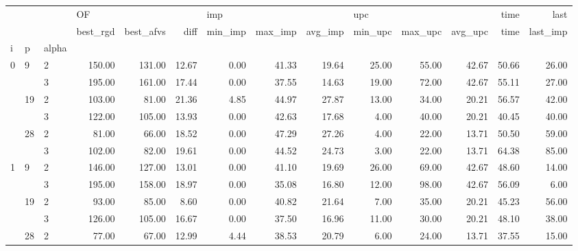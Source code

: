 \begin{tabular}{lllrrrrrrrrrrr}
\toprule
  &    &   & \multicolumn{3}{l}{OF} & \multicolumn{3}{l}{imp} & \multicolumn{3}{l}{upc} &   time &     last \\
  &    &   & best\_rgd & best\_afvs &  diff & min\_imp & max\_imp & avg\_imp & min\_upc & max\_upc & avg\_upc &   time & last\_imp \\
i & p & alpha &          &           &       &         &         &         &         &         &         &        &          \\
\midrule
\multirow{6}{*}{0} & \multirow{2}{*}{9} & 2 &   150.00 &    131.00 & 12.67 &    0.00 &   41.33 &   19.64 &   25.00 &   55.00 &   42.67 &  50.66 &    26.00 \\
  &    & 3 &   195.00 &    161.00 & 17.44 &    0.00 &   37.55 &   14.63 &   19.00 &   72.00 &   42.67 &  55.11 &    27.00 \\
\cline{2-14}
  & \multirow{2}{*}{19} & 2 &   103.00 &     81.00 & 21.36 &    4.85 &   44.97 &   27.87 &   13.00 &   34.00 &   20.21 &  56.57 &    42.00 \\
  &    & 3 &   122.00 &    105.00 & 13.93 &    0.00 &   42.63 &   17.68 &    4.00 &   40.00 &   20.21 &  40.45 &    40.00 \\
\cline{2-14}
  & \multirow{2}{*}{28} & 2 &    81.00 &     66.00 & 18.52 &    0.00 &   47.29 &   27.26 &    4.00 &   22.00 &   13.71 &  50.50 &    59.00 \\
  &    & 3 &   102.00 &     82.00 & 19.61 &    0.00 &   44.52 &   24.73 &    3.00 &   22.00 &   13.71 &  64.38 &    85.00 \\
\cline{1-14}
\cline{2-14}
\multirow{6}{*}{1} & \multirow{2}{*}{9} & 2 &   146.00 &    127.00 & 13.01 &    0.00 &   41.10 &   19.69 &   26.00 &   69.00 &   42.67 &  48.60 &    14.00 \\
  &    & 3 &   195.00 &    158.00 & 18.97 &    0.00 &   35.08 &   16.80 &   12.00 &   98.00 &   42.67 &  56.09 &     6.00 \\
\cline{2-14}
  & \multirow{2}{*}{19} & 2 &    93.00 &     85.00 &  8.60 &    0.00 &   40.82 &   21.64 &    7.00 &   35.00 &   20.21 &  45.23 &    56.00 \\
  &    & 3 &   126.00 &    105.00 & 16.67 &    0.00 &   37.50 &   16.96 &   11.00 &   30.00 &   20.21 &  48.10 &    38.00 \\
\cline{2-14}
  & \multirow{2}{*}{28} & 2 &    77.00 &     67.00 & 12.99 &    4.44 &   38.53 &   20.79 &    6.00 &   24.00 &   13.71 &  37.55 &    15.00 \\

\end{tabular}
